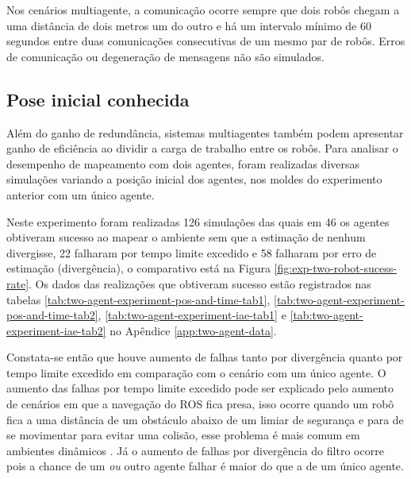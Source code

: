 Nos cenários multiagente, a comunicação ocorre sempre que dois robôs 
chegam a uma distância de dois metros um do outro e há um intervalo 
mínimo de 60 segundos entre duas comunicações consecutivas de um mesmo 
par de robôs. Erros de comunicação ou degeneração de mensagens não são 
simulados.

\subsection{Pose inicial conhecida}
\label{sec:exp-known-initial-pose}
Além do ganho de redundância, sistemas multiagentes também podem 
apresentar ganho de eficiência ao dividir a carga de trabalho entre os 
robôs. Para analisar o desempenho de mapeamento com dois agentes, 
foram realizadas diversas simulações variando a posição inicial dos 
agentes, nos moldes do experimento anterior com um único agente.

Neste experimento foram realizadas 126 simulações das quais em 46 os 
agentes obtiveram sucesso ao mapear o ambiente sem que a estimação de 
nenhum divergisse, 22 falharam por tempo limite excedido e 58 
falharam por erro de estimação (divergência), o comparativo está na 
Figura \ref{fig:exp-two-robot-sucess-rate}. Os dados das realizações 
que obtiveram sucesso estão registrados nas tabelas \ref{tab:two-agent-experiment-pos-and-time-tab1}, \ref{tab:two-agent-experiment-pos-and-time-tab2}, \ref{tab:two-agent-experiment-iae-tab1} e \ref{tab:two-agent-experiment-iae-tab2} no Apêndice \ref{app:two-agent-data}.

Constata-se então que houve aumento de falhas 
tanto por divergência quanto por tempo limite excedido em comparação 
com o cenário com um único agente. O aumento das falhas por tempo limite 
excedido pode ser explicado pelo aumento de cenários em que a navegação do 
ROS fica presa, isso ocorre quando um robô fica a uma distância de um obstáculo abaixo de um limiar de segurança e para de se movimentar para evitar uma colisão, esse problema é mais comum em ambientes dinâmicos \cite{zheng2021ros}. Já o aumento de falhas por divergência do filtro ocorre 
pois a chance de um \emph{ou} outro agente falhar é maior do que a de um único agente.

